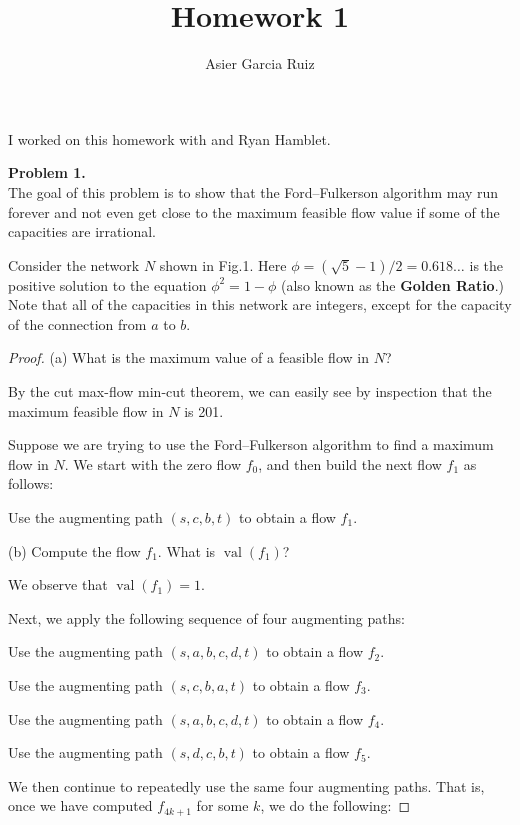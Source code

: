 \documentclass{article}
\title{Homework 1}
\author{Asier Garcia Ruiz}
\DeclareMathOperator*{\val}{val}
\newenvironment{hwproof}[2]
{
    \textbf{Problem #1.}\\
    #2
    \begin{proof}
}{
    \end{proof}
    \newpage
}
\begin{document}
\maketitle

I worked on this homework with and Ryan Hamblet.

\begin{hwproof}
    {1}
    {The goal of this problem is to show that the Ford--Fulkerson algorithm may run forever and not even get close to the maximum feasible
        flow value if some of the capacities are irrational.

        \medskip

        Consider the network $N$ shown in Fig.1. Here $\phi = (\sqrt{5}-1)/2 = 0.618\ldots$ is the positive solution to the equation
        $\phi^2 = 1 - \phi$ (also known as the \textbf{Golden Ratio}.) Note that all of the capacities in this network are integers, except for
        the capacity of the connection from $a$ to $b$.
    }

    (a) What is the maximum value of a feasible flow in $N$?

    By the cut max-flow min-cut theorem, we can easily see by inspection that the maximum feasible flow in $N$ is 201.

    Suppose we are trying to use the Ford--Fulkerson algorithm to find a maximum flow in $N$. We start with the zero flow $f_0$, and then build
    the next flow $f_1$ as follows:

    \begin{leftbar}
        Use the augmenting path $(s,c,b,t)$ to obtain a flow $f_1$.
    \end{leftbar}
    (b) Compute the flow $f_1$. What is $\val(f_1)$?

    We observe that $\val(f_1) = 1$.

    Next, we apply the following sequence of four augmenting paths:

    \begin{leftbar}
        Use the augmenting path $(s,a,b,c,d,t)$ to obtain a flow $f_2$.

        Use the augmenting path $(s,c,b,a,t)$ to obtain a flow $f_3$.

        Use the augmenting path $(s,a,b,c,d,t)$ to obtain a flow $f_4$.

        Use the augmenting path $(s,d,c,b,t)$ to obtain a flow $f_5$.
    \end{leftbar}

    We then continue to repeatedly use the same four augmenting paths. That is, once we have computed $f_{4k+1}$ for some $k$, we do the following:


\end{hwproof}
\end{document}
